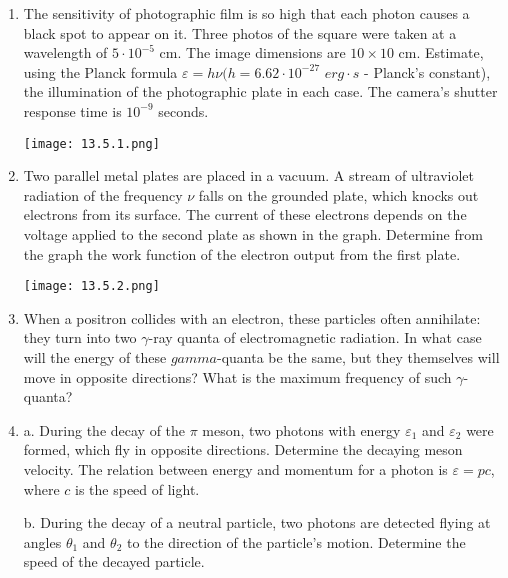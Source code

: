 \documentclass{article}
\begin{document}
\begin{enumerate}[label=13.5.\arabic*]



\item The sensitivity of photographic film is so high that each photon causes a black spot to appear on it. Three photos of the square were taken at a wavelength of $5 \cdot 10^{-5}$ cm. The image dimensions are $10 \times 10$ cm. Estimate, using the Planck formula $\varepsilon = h \nu (h = 6.62 \cdot 10^{-27}$ $erg \cdot s$ - Planck's constant), the illumination of the photographic plate in each case. The camera's shutter response time is $10^{-9}$ seconds.

\begin{center}
    \texttt{[image: 13.5.1.png]}
\end{center}

\item Two parallel metal plates are placed in a vacuum. A stream of ultraviolet radiation of the frequency $\nu$ falls on the grounded plate, which knocks out electrons from its surface. The current of these electrons depends on the voltage applied to the second plate as shown in the graph. Determine from the graph the work function of the electron output from the first plate.

\begin{center}
    \texttt{[image: 13.5.2.png]}
\end{center}

\item When a positron collides with an electron, these particles often annihilate: they turn into two $\gamma$-ray quanta of electromagnetic radiation. In what case will the energy of these $gamma$-quanta be the same, but they themselves will move in opposite directions? What is the maximum frequency of such $\gamma$-quanta?

\item a. During the decay of the $\pi$ meson, two photons with energy $\varepsilon_1$ and $\varepsilon_2$ were formed, which fly in opposite directions. Determine the decaying meson velocity. The relation between energy and momentum for a photon is $\varepsilon = pc$, where $c$ is the speed of light. 

b. During the decay of a neutral particle, two photons are detected flying at angles $\theta_1$ and $\theta_2$ to the direction of the particle's motion. Determine the speed of the decayed particle.


\end{enumerate}
\end{document}
